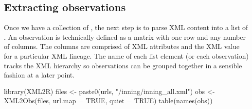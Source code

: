 \begin{article}
\subsection{Extracting observations}

Once we have a collection of , the next step is to parse
XML content into a list of . An observation is
technically defined as a matrix with one row and any number of columns.
The columns are comprised of XML attributes and the XML value for
a particular XML lineage. The name of each list element (or each observation)
tracks the XML hierarchy so observations can be grouped together in
a sensible fashion at a later point.
%
\begin{Schunk}
\begin{Sinput}
library(XML2R)
files <- paste0(urls, "/inning/inning_all.xml")
obs <- XML2Obs(files, url.map = TRUE, quiet = TRUE) 
table(names(obs))
\end{Sinput}
\begin{Soutput}


\end{Soutput}
\end{Schunk}
\end{article}
